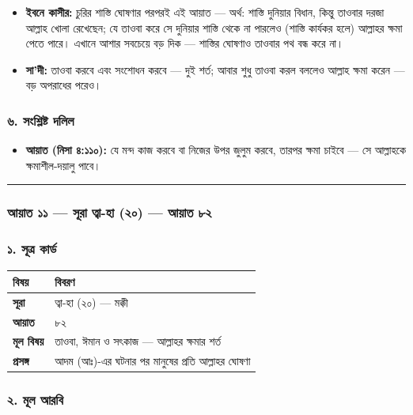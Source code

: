 \begin{itemize}
\item \textbf{ইবনে কাসীর:} চুরির শাস্তি ঘোষণার পরপরই এই আয়াত — অর্থ: শাস্তি দুনিয়ার বিধান, কিন্তু তাওবার দরজা আল্লাহ খোলা রেখেছেন; যে তাওবা করে সে দুনিয়ার শাস্তি থেকে না পারলেও (শাস্তি কার্যকর হলে) আল্লাহর ক্ষমা পেতে পারে। এখানে আশার সবচেয়ে বড় দিক — শাস্তির ঘোষণাও তাওবার পথ বন্ধ করে না।
\item \textbf{সা'দী:} তাওবা করবে এবং সংশোধন করবে — দুই শর্ত; আবার শুধু তাওবা করল বললেও আল্লাহ ক্ষমা করেন — বড় অপরাধের পরেও।
\end{itemize}
\subsubsection*{৬. সংশ্লিষ্ট দলিল}

\begin{itemize}
\item \textbf{আয়াত (নিসা ৪:১১০):} যে মন্দ কাজ করবে বা নিজের উপর জুলুম করবে, তারপর ক্ষমা চাইবে — সে আল্লাহকে ক্ষমাশীল-দয়ালু পাবে।
\end{itemize}
\medskip\hrule\medskip

\subsubsection*{আয়াত ১১ — সূরা ত্বা-হা (২০) — আয়াত ৮২}

\subsubsection*{১. সূত্র কার্ড}

\begin{table}[h]\centering\small
\begin{tabular}{ll}
বিষয় & বিবরণ \\
\hline
\textbf{সূরা} & ত্বা-হা (২০) — মক্কী \\
\textbf{আয়াত} & ৮২ \\
\textbf{মূল বিষয়} & তাওবা, ঈমান ও সৎকাজ — আল্লাহর ক্ষমার শর্ত \\
\textbf{প্রসঙ্গ} & আদম (আঃ)-এর ঘটনার পর মানুষের প্রতি আল্লাহর ঘোষণা \\
\hline
\end{tabular}
\end{table}

\subsubsection*{২. মূল আরবি}

